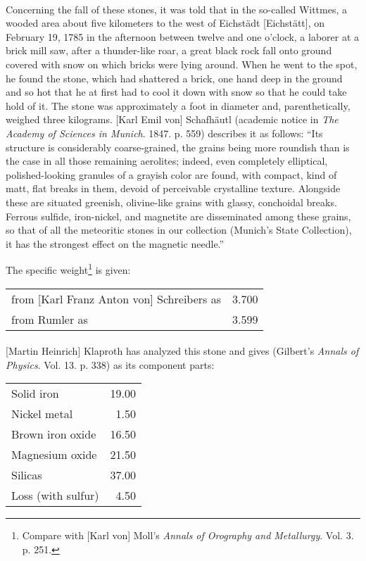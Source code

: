 \documentclass[a4paper, 12pt, oneside]{article}
\begin{document}
\paragraph{}
Concerning the fall of these stones, it was told that in the so-called Wittmes, a wooded area about five kilometers to the west of Eichstädt [Eichstätt], on February 19, 1785 in the afternoon between twelve and one o'clock, a laborer at a brick mill saw, after a thunder-like roar, a great black rock fall onto ground covered with snow on which bricks were lying around. When he went to the spot, he found the stone, which had shattered a brick, one hand deep in the ground and so hot that he at first had to cool it down with snow so that he could take hold of it. The stone was approximately a foot in diameter and, parenthetically, weighed three kilograms. [Karl Emil von] Schafhäutl (academic notice in \emph{The Academy of Sciences in Munich}. 1847. p. 559) describes it as follows: ``Its structure is considerably coarse-grained, the grains being more roundish than is the case in all those remaining aerolites; indeed, even completely elliptical, polished-looking granules of a grayish color are found, with compact, kind of matt, flat breaks in them, devoid of perceivable crystalline texture. Alongside these are situated greenish, olivine-like grains with glassy, conchoidal breaks. Ferrous sulfide, iron-nickel, and magnetite are disseminated among these grains, so that of all the meteoritic stones in our collection (Munich's State Collection), it has the strongest effect on the magnetic needle.''

The specific weight\footnote{Compare with [Karl von] Moll's \emph{Annals of Orography and Metallurgy}. Vol. 3. p. 251.} is given:
\begin{center}
    \begin{tabular}{l r}
        from [Karl Franz Anton von] Schreibers as & 3.700\\
        from Rumler as & 3.599\\
    \end{tabular}
\end{center}
\paragraph{}
[Martin Heinrich] Klaproth has analyzed this stone and gives (Gilbert's \emph{Annals of Physics}. Vol. 13. p. 338) as its component parts:
\begin{center}
    \begin{tabular}{l r}
        Solid iron & 19.00\\
        Nickel metal & 1.50\\
        Brown iron oxide & 16.50\\
        Magnesium oxide & 21.50\\
        Silicas & 37.00\\
        Loss (with sulfur) & 4.50\\
    \end{tabular}
\end{center}
\end{document}
